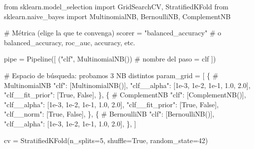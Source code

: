 \documentclass[
  letterpaper,
  DIV=11,
  numbers=noendperiod]{scrartcl}
\newenvironment{Shaded}{\begin{snugshade}}{\end{snugshade}}
\newcommand{\CommentTok}[1]{\textcolor[rgb]{0.37,0.37,0.37}{#1}}
\newcommand{\DecValTok}[1]{\textcolor[rgb]{0.68,0.00,0.00}{#1}}
\newcommand{\FloatTok}[1]{\textcolor[rgb]{0.68,0.00,0.00}{#1}}
\newcommand{\ImportTok}[1]{\textcolor[rgb]{0.00,0.46,0.62}{#1}}
\newcommand{\NormalTok}[1]{\textcolor[rgb]{0.00,0.23,0.31}{#1}}
\newcommand{\OperatorTok}[1]{\textcolor[rgb]{0.37,0.37,0.37}{#1}}
\newcommand{\StringTok}[1]{\textcolor[rgb]{0.13,0.47,0.30}{#1}}
\newcommand{\VariableTok}[1]{\textcolor[rgb]{0.07,0.07,0.07}{#1}}
\begin{document}
\begin{Shaded}
\begin{Highlighting}[]
\ImportTok{from}\NormalTok{ sklearn.model\_selection }\ImportTok{import}\NormalTok{ GridSearchCV, StratifiedKFold}
\ImportTok{from}\NormalTok{ sklearn.naive\_bayes }\ImportTok{import}\NormalTok{ MultinomialNB, BernoulliNB, ComplementNB}

\CommentTok{\# Métrica (elige la que te convenga)}
\NormalTok{scorer }\OperatorTok{=} \StringTok{"balanced\_accuracy"}  \CommentTok{\# o \textquotesingle{}balanced\_accuracy\textquotesingle{}, \textquotesingle{}roc\_auc\textquotesingle{}, \textquotesingle{}accuracy\textquotesingle{}, etc.}


\NormalTok{pipe }\OperatorTok{=}\NormalTok{ Pipeline([}
\NormalTok{    (}\StringTok{"clf"}\NormalTok{, MultinomialNB())  }\CommentTok{\# nombre del paso = \textquotesingle{}clf\textquotesingle{}}
\NormalTok{])}

\CommentTok{\# Espacio de búsqueda: probamos 3 NB distintos}
\NormalTok{param\_grid }\OperatorTok{=}\NormalTok{ [}
\NormalTok{  \{  }\CommentTok{\# MultinomialNB}
    \StringTok{"clf"}\NormalTok{: [MultinomialNB()],}
    \StringTok{"clf\_\_alpha"}\NormalTok{: [}\FloatTok{1e{-}3}\NormalTok{, }\FloatTok{1e{-}2}\NormalTok{, }\FloatTok{1e{-}1}\NormalTok{, }\FloatTok{1.0}\NormalTok{, }\FloatTok{2.0}\NormalTok{],}
    \StringTok{"clf\_\_fit\_prior"}\NormalTok{: [}\VariableTok{True}\NormalTok{, }\VariableTok{False}\NormalTok{],}
\NormalTok{  \},}
\NormalTok{  \{  }\CommentTok{\# ComplementNB}
    \StringTok{"clf"}\NormalTok{: [ComplementNB()],}
    \StringTok{"clf\_\_alpha"}\NormalTok{: [}\FloatTok{1e{-}3}\NormalTok{, }\FloatTok{1e{-}2}\NormalTok{, }\FloatTok{1e{-}1}\NormalTok{, }\FloatTok{1.0}\NormalTok{, }\FloatTok{2.0}\NormalTok{],}
    \StringTok{"clf\_\_fit\_prior"}\NormalTok{: [}\VariableTok{True}\NormalTok{, }\VariableTok{False}\NormalTok{],}
    \StringTok{"clf\_\_norm"}\NormalTok{: [}\VariableTok{True}\NormalTok{, }\VariableTok{False}\NormalTok{],}
\NormalTok{  \},}
\NormalTok{  \{  }\CommentTok{\# BernoulliNB}
    \StringTok{"clf"}\NormalTok{: [BernoulliNB()],}
    \StringTok{"clf\_\_alpha"}\NormalTok{: [}\FloatTok{1e{-}3}\NormalTok{, }\FloatTok{1e{-}2}\NormalTok{, }\FloatTok{1e{-}1}\NormalTok{, }\FloatTok{1.0}\NormalTok{, }\FloatTok{2.0}\NormalTok{],}
\NormalTok{  \},}
\NormalTok{]}

\NormalTok{cv }\OperatorTok{=}\NormalTok{ StratifiedKFold(n\_splits}\OperatorTok{=}\DecValTok{5}\NormalTok{, shuffle}\OperatorTok{=}\VariableTok{True}\NormalTok{, random\_state}\OperatorTok{=}\DecValTok{42}\NormalTok{)}


\end{Highlighting}
\end{Shaded}
\end{document}
